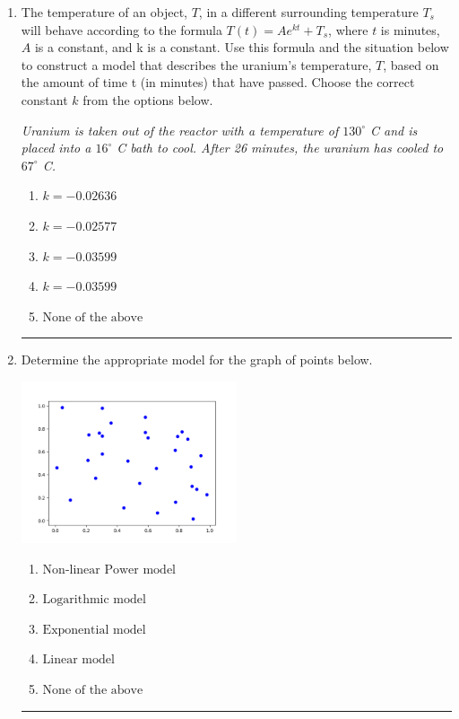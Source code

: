 \documentclass[14pt]{extbook}
\newcommand{\litem}[1]{\item#1\hspace*{-1cm}\rule{\textwidth}{0.4pt}}
\begin{document}
\begin{enumerate}
\litem{
The temperature of an object, $T$, in a different surrounding temperature $T_s$ will behave according to the formula $T(t) = Ae^{kt} + T_s$, where $t$ is minutes, $A$ is a constant, and k is a constant. Use this formula and the situation below to construct a model that describes the uranium's temperature, $T$, based on the amount of time t (in minutes) that have passed. Choose the correct constant $k$ from the options below.
\begin{center}
    \textit{ Uranium is taken out of the reactor with a temperature of $130^{\circ}$ C and is placed into a $16^{\circ}$ C bath to cool. After 26 minutes, the uranium has cooled to $67^{\circ}$ C. }
\end{center}
\begin{enumerate}[label=\Alph*.]
\item \( k = -0.02636 \)
\item \( k = -0.02577 \)
\item \( k = -0.03599 \)
\item \( k = -0.03599 \)
\item \( \text{None of the above} \)

\end{enumerate} }
\litem{
Determine the appropriate model for the graph of points below.
\begin{center}
    \includegraphics[width=0.5\textwidth]{../Figures/identifyModelGraph11B.png}
\end{center}
\begin{enumerate}[label=\Alph*.]
\item \( \text{Non-linear Power model} \)
\item \( \text{Logarithmic model} \)
\item \( \text{Exponential model} \)
\item \( \text{Linear model} \)
\item \( \text{None of the above} \)


\end{enumerate}}
\end{enumerate}
\end{document}
